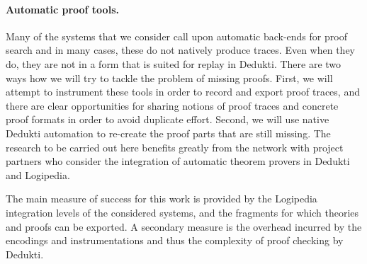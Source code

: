 \paragraph*{Automatic proof tools.}
Many of the systems that we consider call upon automatic back-ends for proof
search and in many cases, these do not natively produce traces. Even
when they do, they are not in a form that is suited for replay in
Dedukti. There are two ways how we will try to tackle the problem of
missing proofs. First, we will attempt to instrument these tools in
order to record and export proof traces, and there are clear
opportunities for sharing notions of proof traces and concrete proof
formats in order to avoid duplicate effort. Second, we will use native
Dedukti automation to re-create the proof parts that are still missing.
The research to be carried out here benefits greatly from the network with
project partners who consider the integration of automatic theorem provers in
Dedukti and Logipedia.

The main measure of success for this work is provided by the Logipedia
integration levels of the considered systems, and the fragments for which
theories and proofs can be exported. A secondary measure is the overhead
incurred by the encodings and instrumentations and thus the complexity of proof
checking by Dedukti.


